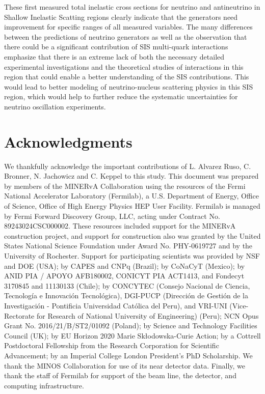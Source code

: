 \documentclass[aps, prd, twocolumn, showpacs, superscriptaddress, floatfix]{revtex4-2}
\begin{document}
These first measured total inelastic cross sections for neutrino and antineutrino in Shallow Inelastic Scatting regions clearly indicate that the generators need improvement for specific ranges of all measured variables. The many differences between the predictions of neutrino generators as well as the observation that there could be a significant contribution of SIS multi-quark interactions emphasize that there is an extreme lack of both the necessary detailed experimental investigations and the theoretical studies of interactions in this region that could enable a better understanding of the SIS contributions. This would lead to better modeling of neutrino-nucleus scattering physics in this SIS region, which would help to further reduce the systematic uncertainties for neutrino oscillation experiments.

\section{Acknowledgments}
We thankfully acknowledge the important contributions of L. Alvarez Ruso, C. Bronner, N. Jachowicz and C. Keppel to this study. 
This document was prepared by members of the MINERvA Collaboration using the resources of the Fermi National Accelerator Laboratory (Fermilab), a U.S. Department of Energy, Office of Science, Office of High Energy Physics HEP User Facility. Fermilab is managed by Fermi Forward Discovery Group, LLC, acting under Contract No. 89243024CSC000002. These resources included support for the MINERvA construction project, and support for construction also was granted by the United States National Science Foundation under Award No. PHY-0619727 and by the University of Rochester. Support for participating scientists was provided by NSF and DOE (USA); by CAPES and CNPq (Brazil); by CoNaCyT (Mexico); by ANID PIA / APOYO AFB180002, CONICYT PIA ACT1413, and Fondecyt 3170845 and 11130133 (Chile); by CONCYTEC (Consejo Nacional de Ciencia, Tecnolog\'ia e Innovaci\'on Tecnol\'ogica), DGI-PUCP (Direcci\'on de Gesti\'on de la Investigaci\'on - Pontificia Universidad Cat\'olica del Peru), and VRI-UNI (Vice-Rectorate for Research of National University of Engineering) (Peru); NCN Opus Grant No. 2016/21/B/ST2/01092 (Poland); by Science and Technology Facilities Council (UK); by EU Horizon 2020 Marie Skłodowska-Curie Action; by a Cottrell Postdoctoral Fellowship from the Research Corporation for Scientific Advancement; by an Imperial College London President's PhD Scholarship. We thank the MINOS Collaboration for use of its near detector data. Finally, we thank the staff of Fermilab for support of the beam line, the detector, and computing infrastructure.



\end{document}

